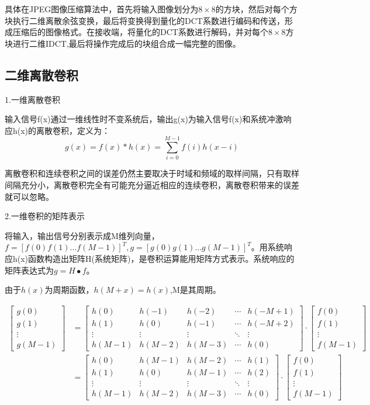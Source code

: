 \documentclass[11pt]{article}
\begin{document}
具体在JPEG图像压缩算法中，首先将输入图像划分为$8\times8$的方块，然后对每个方块执行二维离散余弦变换，最后将变换得到量化的DCT系数进行编码和传送，形成压缩后的图像格式。在接收端，将量化的DCT系数进行解码，并对每个$8\times 8$方块进行二维IDCT,最后将操作完成后的块组合成一幅完整的图像。
\subsection{二维离散卷积}
1.一维离散卷积

输入信号f(x)通过一维线性时不变系统后，输出g(x)为输入信号f(x)和系统冲激响应h(x)的离散卷积，定义为：
$$g(x)=f(x)*h(x)=\sum_{i=0}^{M-1}f(i)h(x-i)$$

离散卷积和连续卷积之间的误差仍然主要取决于时域和频域的取样间隔，只有取样间隔充分小，离散卷积完全有可能充分逼近相应的连续卷积，离散卷积带来的误差就可以忽略。

2.一维卷积的矩阵表示

将输入，输出信号分别表示成M维列向量，$f=[f(0) f(1) ... f(M-1)]^T, g=[g(0) g(1) ... g(M-1)]^T$。用系统响应h(x)函数构造出矩阵H(系统矩阵)，是卷积运算能用矩阵方式表示。系统响应的矩阵表达式为$g=H\bullet f$。

由于$h(x)$为周期函数，$h(M+x)=h(x)$,M是其周期。

$$\begin{aligned}
	\begin{bmatrix} 
		g(0)\\g(1)\\\vdots\\g(M-1) \end{bmatrix}&= \begin{bmatrix}
		h(0) & h(-1) & h(-2) & \cdots & h(-M+1) \\
		h(1) & h(0) & h(-1) & \cdots & h(-M+2) \\
		\vdots & \vdots & \vdots & \ddots & \vdots \\
		h(M-1) & h(M-2) & h(M-3) & \cdots & h(0)
	\end{bmatrix}\cdot \begin{bmatrix} 
		f(0)\\f(1)\\\vdots\\f(M-1) \end{bmatrix} \\ &=\begin{bmatrix}
		h(0) & h(M-1) & h(M-2) & \cdots & h(1) \\
		h(1) & h(0) & h(M-1) & \cdots & h(2) \\
		\vdots & \vdots & \vdots & \ddots & \vdots \\
		h(M-1) & h(M-2) & h(M-3) & \cdots & h(0)
	\end{bmatrix}\cdot \begin{bmatrix} 
		f(0)\\f(1)\\\vdots\\f(M-1) \end{bmatrix}
\end{aligned}$$
\end{document}

